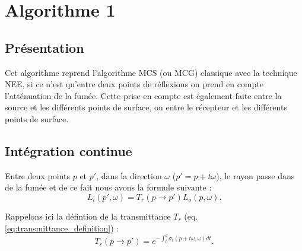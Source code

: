 \chapter{Algorithme 1}

\section{Présentation}

Cet algorithme reprend l'algorithme MCS (ou MCG) classique avec la technique NEE, si ce n'est qu'entre deux points de réflexions on prend en compte l'atténuation de la fumée. Cette prise en compte est également faite entre la source et les différents points de surface, ou entre le récepteur et les différents points de surface.

\section{Intégration continue}

Entre deux points $p$ et $p'$, dans la direction $\omega$ ($p' = p + t\omega$), le rayon passe dans de la fumée et de ce fait nous avons la formule suivante :
\large \begin{equation}
    L_i(p', \omega) = T_r(p \rightarrow p')L_o(p, \omega)
.\end{equation} \normalsize \par
Rappelons ici la défintion de la transmittance $T_r$ (eq. \ref{eq:transmittance_definition}) :
\large \begin{equation}
    T_{r}(p\longrightarrow p') = e^{-\int_{0}^{d} \sigma_{t}(p+t\omega, \omega)dt}
.\end{equation} \normalsize


